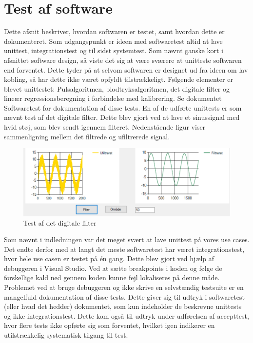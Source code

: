 \section{Test af software}
Dette afsnit beskriver, hvordan softwaren er testet, samt hvordan dette er dokumenteret. Som udgangspunkt er ideen med softwaretest altid at lave unittest, integrationstest og til sidst systemtest. Som nævnt ganske kort i afsnittet software design, så viste det sig at være sværere at unitteste softwaren end forventet. Dette tyder på at selvom softwaren er designet ud fra ideen om lav kobling, så har dette ikke været opfyldt tilstrækkeligt. 
Følgende elementer er blevet unittestet: Pulsalgoritmen, blodtryksalgoritmen, det digitale filter og lineær regressionsberegning i forbindelse med kalibrering. Se dokumentet Softwaretest for dokumentation af disse tests. 
En af de udførte unittests er som nævnt test af det digitale filter. Dette blev gjort ved at lave et sinussignal med hvid støj, som blev sendt igennem filteret. Nedenstående figur viser sammenligning mellem det filtrede og ufiltrerede signal. 

\vspace{0.5 cm}
\begin{figure}[h!]
	\centering
	\includegraphics[width=1\linewidth]{Implementering_og_test/Software/filter_test}	
	\caption{Test af det digitale filter}
	\label{fig:ufiltreret}
\end{figure}

Som nævnt i indledningen var det meget svært at lave unittest på vores use cases. Det endte derfor med at langt det meste softwaretest har været integrationstest, hvor hele use casen er testet på én gang. Dette blev gjort ved hjælp af debuggeren i Visual Studio. Ved at sætte breakpoints i koden og følge de forskellige kald ned gennem koden kunne fejl lokaliseres på denne måde. Problemet ved at bruge debuggeren og ikke skrive en selvstændig testsuite er en mangelfuld dokumentation af disse tests. Dette giver sig til udtryk i softwaretest (eller hvad det hedder) dokumentet, som kun indeholder de beskrevne unittests og ikke integrationstest. Dette kom også til udtryk under udførelsen af accepttest, hvor flere tests ikke opførte sig som forventet, hvilket igen indikerer en utilstrækkelig systematisk tilgang til test. 

